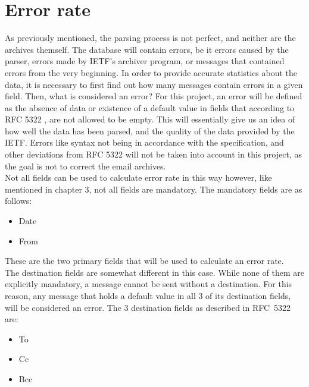 \documentclass[a4paper,english]{report}
\begin{document}
\section{Error rate}

As previously mentioned, the parsing process is not perfect, and neither are the archives themself. The database will contain errors, be it errors caused by the parser, errors made by IETF's archiver program, or messages that contained errors from the very beginning.
In order to provide accurate statistics about the data, it is necessary to first find out how many messages contain errors in a given field. 
Then, what is considered an error?
For this project, an error will be defined as the absence of data or existence of a default value in fields that according to RFC 5322 \cite{RFC5322}, are not allowed to be empty. 
This will essentially give us an idea of how well the data has been parsed, and the quality of the data provided by the IETF.
Errors like syntax not being in accordance with the specification, and other deviations from RFC 5322 \cite{RFC5322} will not be taken into account in this project, as the goal is not to correct the email archives.\\

Not all fields can be used to calculate error rate in this way however, like mentioned in chapter 3, not all fields are mandatory. The mandatory fields are as follows:

\begin{itemize}

\item Date
\item From 


\end{itemize}


These are the two primary fields that will be used to calculate an error rate.\\

The destination fields are somewhat different in this case. While none of them are explicitly mandatory, a message cannot be sent without a destination. For this reason, any message that holds a default value in all 3 of its destination fields, will be considered an error.
The 3 destination fields as described in RFC~5322 are:
\begin{itemize}
\item To
\item Cc
\item Bcc

\end{itemize}
\end{document}
